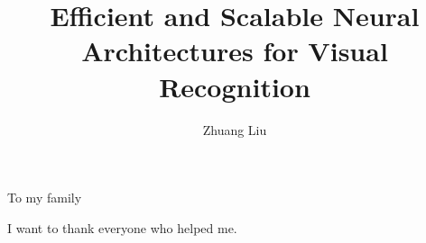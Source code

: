 \documentclass{ucbthesis}
\begin{document}

\title{Efficient and Scalable Neural Architectures for Visual Recognition}
\author{Zhuang Liu}


\maketitle
\copyrightpage



\begin{frontmatter}

\begin{dedication}
\null\vfil
\begin{center}
To my family
\end{center}
\vfil\null
\end{dedication}


\tableofcontents
\clearpage
\listoffigures
\clearpage
\listoftables

\begin{acknowledgements}
I want to thank everyone who helped me.
\end{acknowledgements}

\end{frontmatter}
\end{document}
